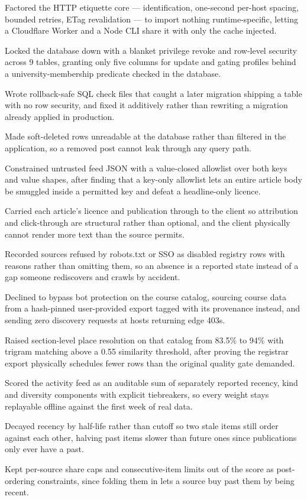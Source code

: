 \documentclass[letterpaper,11pt]{article}
\newcommand{\resumeItem}[1]{
  \item\small{
    {#1 \vspace{-2pt}}
  }
}
\begin{document}
            \resumeItem{Factored the HTTP etiquette core --- identification, one-second per-host spacing, bounded retries, ETag revalidation --- to import nothing runtime-specific, letting a Cloudflare Worker and a Node CLI share it with only the cache injected.}
            \resumeItem{Locked the database down with a blanket privilege revoke and row-level security across 9 tables, granting only five columns for update and gating profiles behind a university-membership predicate checked in the database.}
            \resumeItem{Wrote rollback-safe SQL check files that caught a later migration shipping a table with no row security, and fixed it additively rather than rewriting a migration already applied in production.}
            \resumeItem{Made soft-deleted rows unreadable at the database rather than filtered in the application, so a removed post cannot leak through any query path.}
            \resumeItem{Constrained untrusted feed JSON with a value-closed allowlist over both keys and value shapes, after finding that a key-only allowlist lets an entire article body be smuggled inside a permitted key and defeat a headline-only licence.}
            \resumeItem{Carried each article's licence and publication through to the client so attribution and click-through are structural rather than optional, and the client physically cannot render more text than the source permits.}
            \resumeItem{Recorded sources refused by robots.txt or SSO as disabled registry rows with reasons rather than omitting them, so an absence is a reported state instead of a gap someone rediscovers and crawls by accident.}
            \resumeItem{Declined to bypass bot protection on the course catalog, sourcing course data from a hash-pinned user-provided export tagged with its provenance instead, and sending zero discovery requests at hosts returning edge 403s.}
            \resumeItem{Raised section-level place resolution on that catalog from 83.5\% to 94\% with trigram matching above a 0.55 similarity threshold, after proving the registrar export physically schedules fewer rows than the original quality gate demanded.}
            \resumeItem{Scored the activity feed as an auditable sum of separately reported recency, kind and diversity components with explicit tiebreakers, so every weight stays replayable offline against the first week of real data.}
            \resumeItem{Decayed recency by half-life rather than cutoff so two stale items still order against each other, halving past items slower than future ones since publications only ever have a past.}
            \resumeItem{Kept per-source share caps and consecutive-item limits out of the score as post-ordering constraints, since folding them in lets a source buy past them by being recent.}
\end{document}
